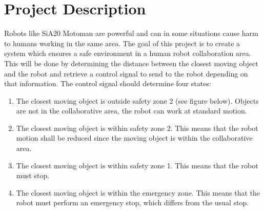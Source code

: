 
\section{Project Description}
Robots like SiA20 Motoman are powerful and can in some situations cause harm to humans working in the same area. The goal of this project is to create a system which ensures a safe environment in a human robot collaboration area. This will be done by determining the distance between the closest moving object and the robot and retrieve a control signal to send to the robot depending on that information. The control signal should determine four states:
\begin{enumerate}
\item The closest moving object is outside safety zone 2 (see figure below). Objects are not in the collaborative area, the robot can work at standard motion. 

\item The closest moving object is within safety zone 2. This means that the robot motion shall be reduced since the moving object is within the collaborative area.

\item The closest moving object is within safety zone 1. This means that the robot must stop.

\item The closest moving object is within the emergency zone. This means that the robot must perform an emergency stop, which differs from the usual stop. 
\end{enumerate}
